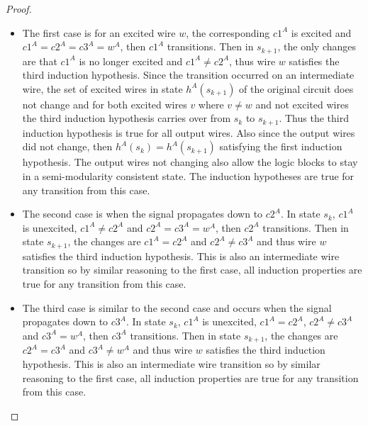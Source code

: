 \documentclass[12pt]{report}
\begin{document}
\begin{proof}
\begin{itemize}
\item The first case is for an excited wire $w$, the corresponding $c1^A$ is excited and $c1^A=c2^A=c3^A=w^A$, then $c1^A$ transitions.  Then in $s_{k+1}$, the only changes are that $c1^A$ is no longer excited and $c1^A\neq c2^A$, thus wire $w$ satisfies the third induction hypothesis.  Since the transition occurred on an intermediate wire, the set of excited wires in state $h^A(s_{k+1})$ of the original circuit does not change and for both excited wires $v$ where $v\neq w$ and not excited wires the third induction hypothesis carries over from $s_k$ to $s_{k+1}$.  Thus the third induction hypothesis is true for all output wires.  Also since the output wires did not change, then $h^A(s_k)=h^A(s_{k+1})$ satisfying the first induction hypothesis.  The output wires not changing also allow the logic blocks to stay in a semi-modularity consistent state.   The induction hypotheses are true for any transition from this case.  %
\item The second case is when the signal propagates down to $c2^A$.  In state $s_k$, $c1^A$ is unexcited, $c1^{A}\neq c2^{A}$ and $c2^A=c3^A=w^A$, then $c2^A$ transitions.  
Then in state $s_{k+1}$, the changes are $c1^A=c2^A$ and $c2^{A}\neq c3^{A}$ and thus wire $w$ satisfies the third induction hypothesis.  This is also an intermediate wire transition so by similar reasoning to the first case, all induction properties are true for any transition from this case.   
\item The third case is similar to the second case and occurs when the signal propagates down to $c3^A$.  In state $s_k$, $c1^A$ is unexcited, $c1^A=c2^A$, $c2^{A}\neq c3^{A}$ and $c3^A=w^A$, then $c3^A$ transitions.  
Then in state $s_{k+1}$, the changes are $c2^A=c3^A$ and $c3^{A}\neq w^{A}$ and thus wire $w$ satisfies the third induction hypothesis.  This is also an intermediate wire transition so by similar reasoning to the first case, all induction properties are true for any transition from this case.   


\end{itemize}
\end{proof}
\end{document}
